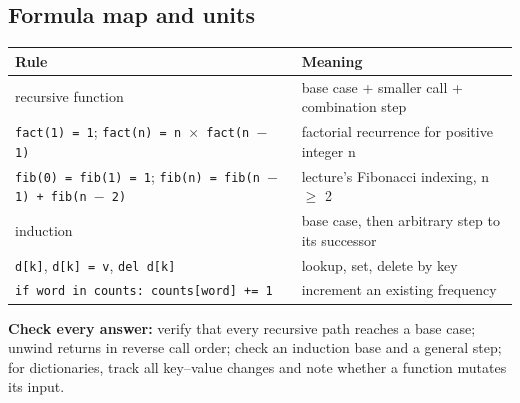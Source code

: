 \documentclass[11pt]{article}
\begin{document}
\begin{keepsection}
\section{Formula map and units}

\begin{center}\small\begin{tabularx}{\linewidth}{>{\raggedright\arraybackslash}X>{\raggedright\arraybackslash}X}\toprule
\textbf{Rule} & \textbf{Meaning} \\ \midrule
recursive function & base case + smaller call + combination step \\
\texttt{fact(1) = 1}; \texttt{fact(n) = n \ensuremath{\times} fact(n \ensuremath{-} 1)} & factorial recurrence for positive integer n \\
\texttt{fib(0) = fib(1) = 1}; \texttt{fib(n) = fib(n \ensuremath{-} 1) + fib(n \ensuremath{-} 2)} & lecture’s Fibonacci indexing, n \ensuremath{\geq} 2 \\
induction & base case, then arbitrary step to its successor \\
\texttt{d[k]}, \texttt{d[k] = v}, \texttt{del d[k]} & lookup, set, delete by key \\
\texttt{if word in counts: counts[word] += 1} & increment an existing frequency \\
\bottomrule\end{tabularx}\end{center}

\begin{notebox}\textbf{Check every answer:} verify that every recursive path reaches a base case; unwind returns in reverse call order; check an induction base and a general step; for dictionaries, track all key–value changes and note whether a function mutates its input.\end{notebox}
\end{keepsection}
\end{document}
